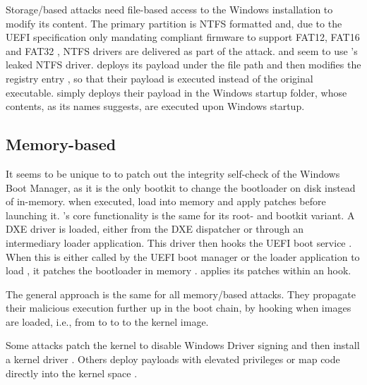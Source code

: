 Storage\-/based attacks need file-based access to the Windows installation to modify its content.
The primary partition is \ac{NTFS} formatted and, due to the \ac{UEFI} specification only mandating compliant firmware to support \ac{FAT}12, \ac{FAT}16 and \ac{FAT}32 \cite[Section 13.3.1.1]{uefi-spec}, \ac{NTFS} drivers are delivered as part of the attack.
\cite{mosaicregressor-technical-details} and \cite{lojax} seem to use \cite{vector-edk}'s leaked \ac{NTFS} driver.
\cite{lojax} deploys its payload under the file path  and then modifies the registry entry , so that their payload is executed instead of the original executable.
\cite{mosaicregressor-technical-details} simply deploys their payload in the Windows startup folder, whose contents, as its names suggests, are executed upon Windows startup.

\subsection{Memory-based}

It seems to be unique to \cite{especter} to patch out the integrity self-check of the Windows Boot Manager, as it is the only bootkit to change the bootloader on disk instead of in-memory.
\cite{finspy, dreamboot} when executed, load  into memory and apply patches before launching it.
\cite{efiguard}'s core functionality is the same for its root- and bootkit variant.
A \ac{DXE} driver is loaded, either from the \ac{DXE} dispatcher or through an intermediary loader application.
This driver then hooks the \ac{UEFI} boot service . When this is either called by the \ac{UEFI} boot manager or the loader application to load , it patches the bootloader in memory \cite{efiguard}. \cite{moonbounce} applies its patches within an  hook.

The general approach is the same for all memory\-/based attacks.
They propagate their malicious execution further up in the boot chain, by hooking when images are loaded, i.e., from  to  to  to the kernel image.

Some attacks patch the kernel to disable Windows Driver signing and then install a kernel driver \cite{efiguard,especter}.
Others deploy payloads with elevated privileges \cite{finspy, dreamboot} or map code directly into the kernel space \cite{moonbounce,cosmicstrand}.